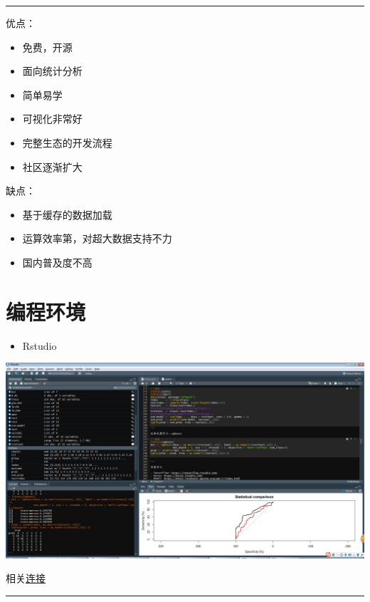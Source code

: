 \documentclass[]{book}
\providecommand{\tightlist}{%
  \setlength{\itemsep}{0pt}\setlength{\parskip}{0pt}}
\begin{document}
\begin{center}\rule{0.5\linewidth}{\linethickness}\end{center}

优点：

\begin{itemize}
\tightlist
\item
  免费，开源
\item
  面向统计分析
\item
  简单易学
\item
  可视化非常好
\item
  完整生态的开发流程
\item
  社区逐渐扩大
\end{itemize}

缺点：

\begin{itemize}
\tightlist
\item
  基于缓存的数据加载
\item
  运算效率第，对超大数据支持不力
\item
  国内普及度不高
\end{itemize}

\hypertarget{section-2}{%
\section{编程环境}\label{section-2}}

\begin{itemize}
\tightlist
\item
  Rstudio
\end{itemize}

\includegraphics{figures/rstudio.jpg}

相关\href{https://www.rstudio.com/products/RStudio/}{连接}

\begin{center}\rule{0.5\linewidth}{\linethickness}\end{center}
\end{document}
